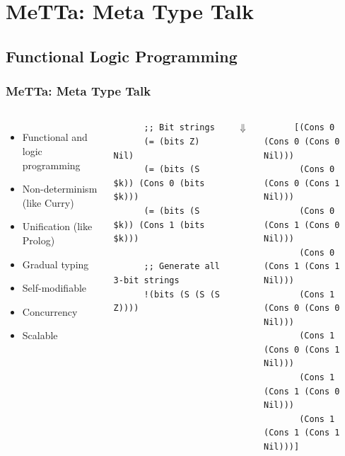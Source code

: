 \documentclass[aspectratio=169]{beamer}
\begin{document}
\section{MeTTa: Meta Type Talk}

\subsection{Functional Logic Programming}

\begin{frame}[fragile]

  \frametitle{MeTTa: Meta Type Talk}

  \begin{columns}

    \column{7cm}
    \begin{itemize}
    \item Functional and logic programming
    \item Non-determinism (like Curry)
    \item Unification (like Prolog)
    \item Gradual typing
    \item Self-modifiable
    \item Concurrency
    \item Scalable
    \end{itemize}

    \column{7cm}

    \begin{lstlisting}
      ;; Bit strings
      (= (bits Z) Nil)
      (= (bits (S $k)) (Cons 0 (bits $k)))
      (= (bits (S $k)) (Cons 1 (bits $k)))

      ;; Generate all 3-bit strings
      !(bits (S (S (S Z))))
    \end{lstlisting}

    \begin{center}
      $\Downarrow$
    \end{center}

    \begin{lstlisting}
      [(Cons 0 (Cons 0 (Cons 0 Nil)))
       (Cons 0 (Cons 0 (Cons 1 Nil)))
       (Cons 0 (Cons 1 (Cons 0 Nil)))
       (Cons 0 (Cons 1 (Cons 1 Nil)))
       (Cons 1 (Cons 0 (Cons 0 Nil)))
       (Cons 1 (Cons 0 (Cons 1 Nil)))
       (Cons 1 (Cons 1 (Cons 0 Nil)))
       (Cons 1 (Cons 1 (Cons 1 Nil)))]
    \end{lstlisting}

  \end{columns}

\end{frame}
\end{document}

